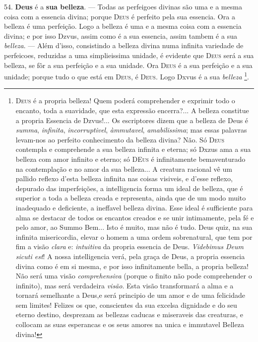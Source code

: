  54. \textbf{Deus} é a \textbf{sua belleza}. --- Todas as perfeigoes divinas são uma e a mesma coisa com a essencia divina; porque \textsc{Deus} é perfeito pela sua essencia. Ora a belleza é uma perfeição. Logo a belleza é uma e a mesma coisa com a essencia divina; e por isso Dzvus, assim como é a sua essencia, assim tambem é a sua \emph{belleza}. --- Além d'isso, consistindo a belleza divina numa infinita variedade de perfeicoes, reduzidas a uma simplieissima unidade, é evidente que \textsc{Deus} será a sua belleza, se fôr a sua perfeição e a sua unidade. Ora \textsc{Deus} é a sua perfeição e a sua unidade; porque tudo o que está em \textsc{Deus}, é \textsc{Deus}. Logo Dxvus é a sua \emph{belleza} \footnote{\textsc{Deus} é a propria belleza! Quem poderá comprehender e exprimir todo o encanto, toda a suavidade, que esta expressão encerra?... A belleza constitue a propria Essencia de Dzvus!... Os escriptores dizem que a belleza de Deus é \emph{summa}, \emph{infinita}, \emph{incorruptivel}, \emph{àmmutavel}, \emph{amabilissima}; mas essas palavras levam-nos ao perfeito conhecimento da belleza divina? Não. Só \textsc{Deus} contempla e comprehende a sua belleza infinita e eterna; só Dxzus ama a sua belleza com amor infinito e eterno; só \textsc{DEus} é infinitamente bemaventurado na contemplação e no amor da sua belleza... A creatura racional vê um pallido reflexo d'esta belleza infinita nas coisas visiveis, e d'esse reflexo, depurado das imperfeições, a intelligencia forma um ideal de belleza, que é superior a toda a belleza creada e representa, ainda que de um modo muito inadequado e deficiente, a ineffavel belleza divina. Esse ideal é sufficiente para alma se destacar de todos os encantos creados e se unir intimamente, pela fé e pelo amor, ao Summo Bem... Isto é muito, mas não é tudo. Deus quiz, na sua infinita misericordia, elevar o homem a uma ordem sobrenatural, que tem por fim a visão \emph{clara} e: \emph{intuitiva} da propria essencia de Deus. \emph{Videbimus Deum sicuti est}! A nossa intelligencia verá, pela graça de Deus, a propria essencia divina como é em si mesma, e por isso infinitamente bella, a propria belleza! Não será uma visão \emph{comprehensiva} (porque o finito não pode comprehender o infinito), mas será verdadeira \emph{visão}. Esta visão transformará a alma e a tornará semelhante a Deus,e será principio de um amor e de uma felicidade sem limites! Felizes os que, conscientes da sua excelsa dignidade e do seu eterno destino, desprezam as bellezas caducas e miseraveis das creaturas, e collocam as suas esperancas e os seus amores na unica e immutavel Belleza divina!}.

